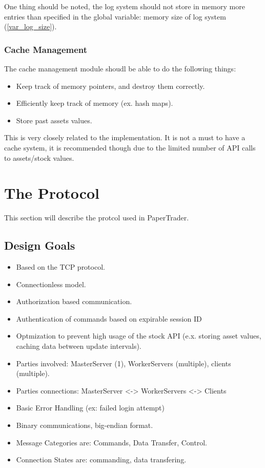 \documentclass[a4paper]{article}
\begin{document}
One thing should be noted, the log system should not store in memory more 
entries than specified in the global variable: memory size of log system
(\ref{var_log_size}).

\subsubsection{Cache Management}
The cache management module shoudl be able to do the following things:
\begin{itemize}
	\item Keep track of memory pointers, and destroy them correctly.
	\item Efficiently keep track of memory (ex. hash maps).
	\item Store past assets values.
\end{itemize}

This is very closely related to the implementation. It is not a must to have a
cache system, it is recommended though due to the limited number of API calls
to assets/stock values.

\section{The Protocol}
This section will describe the protcol used in PaperTrader.

\subsection{Design Goals}
\begin{itemize}
	\item Based on the TCP protocol.
	\item Connectionless model.
	\item Authorization based communication.
	\item Authentication of commands based on expirable session ID
	\item Optmization to prevent high usage of the stock API (e.x. storing
		asset values, caching data between update intervals).
	\item Parties involved: MasterServer (1), WorkerServers (multiple), clients
		(multiple). 
	\item Parties connections: MasterServer <-> WorkerServers <-> Clients
	\item Basic Error Handling (ex: failed login attempt)
	\item Binary communications, big-endian format.
	\item Message Categories are: Commands, Data Transfer, Control.
	\item Connection States are: commanding, data transfering.
\end{itemize}
\end{document}
